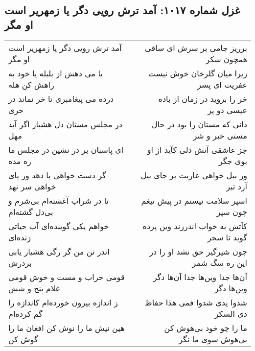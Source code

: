 \begin{center}
\section*{غزل شماره ۱۰۱۷: آمد ترش رویی دگر یا زمهریر است او مگر}
\label{sec:1017}
\begin{longtable}{l p{0.5cm} r}
آمد ترش رویی دگر یا زمهریر است او مگر
&&
برریز جامی بر سرش ای ساقی همچون شکر
\\
یا می دهش از بلبله یا خود به راهش کن هله
&&
زیرا میان گلرخان خوش نیست عفریت ای پسر
\\
درده می پیغامبری تا خر نماند در خری
&&
خر را بروید در زمان از باده عیسی دو پر
\\
در مجلس مستان دل هشیار اگر آید مهل
&&
دانی که مستان را بود در حال مستی خیر و شر
\\
ای پاسبان بر در نشین در مجلس ما ره مده
&&
جز عاشقی آتش دلی کآید از او بوی جگر
\\
گر دست خواهی پا دهد ور پای خواهی سر نهد
&&
ور بیل خواهی عاریت بر جای بیل آرد تبر
\\
تا در شراب آغشته‌ام بی‌شرم و بی‌دل گشته‌ام
&&
اسپر سلامت نیستم در پیش تیغم چون سپر
\\
خواهم یکی گوینده‌ای آب حیاتی زنده‌ای
&&
کآتش به خواب اندرزند وین پرده گوید تا سحر
\\
اندر تن من گر رگی هشیار یابی بردرش
&&
چون شیرگیر حق نشد او را در این ره سگ شمر
\\
قومی خراب و مست و خوش قومی غلام پنج و شش
&&
آن‌ها جدا وین‌ها جدا آن‌ها دگر وین‌ها دگر
\\
ز اندازه بیرون خورده‌ام کاندازه را گم کرده‌ام
&&
شدوا یدی شدوا فمی هذا حفاظ ذی السکر
\\
هین نیش ما را نوش کن افغان ما را گوش کن
&&
ما را چو خود بی‌هوش کن بی‌هوش سوی ما نگر
\\
\end{longtable}
\end{center}
